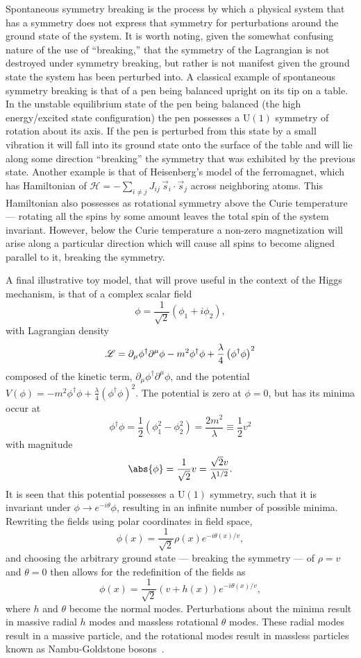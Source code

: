 Spontaneous symmetry breaking is the process by which a physical system that has a symmetry does not express that symmetry for perturbations around the ground state of the system.
It is worth noting, given the somewhat confusing nature of the use of ``breaking,'' that the symmetry of the Lagrangian is not destroyed under symmetry breaking, but rather is not manifest given the ground state the system has been perturbed into.
A classical example of spontaneous symmetry breaking is that of a pen being balanced upright on its tip on a table.
In the unstable equilibrium state of the pen being balanced (the high energy/excited state configuration) the pen possesses a $\mathrm{U}(1)$ symmetry of rotation about its axis.
If the pen is perturbed from this state by a small vibration it will fall into its ground state onto the surface of the table and will lie along some direction ``breaking'' the symmetry that was exhibited by the previous state.
Another example is that of Heisenberg’s model of the ferromagnet, which has Hamiltonian of $\mathcal{H} = -\sum_{i\neq j} J_{ij}\,\vec{s}_{i} \cdot \vec{s}_{j}$ across neighboring atoms.
This Hamiltonian also possesses as rotational symmetry above the Curie temperature --- rotating all the spins by some amount leaves the total spin of the system invariant.
However, below the Curie temperature a non-zero magnetization will arise along a particular direction which will cause all spins to become aligned parallel to it, breaking the symmetry.

A final illustrative toy model, that will prove useful in the context of the Higgs mechanism, is that of a complex scalar field
\[
 \phi = \frac{1}{\sqrt{2}} \left(\phi_{1} + i \phi_{2}\right),
\]
with Lagrangian density
\[
 \mathscr{L} = \partial_{\mu}\phi^{\dagger}\partial^{\mu}\phi - m^{2}\phi^{\dagger}\phi + \frac{\lambda}{4} \left(\phi^{\dagger}\phi\right)^{2}
\]
composed of the kinetic term, $\partial_{\mu}\phi^{\dagger}\partial^{\mu}\phi$, and the potential $V\left(\phi\right) = -m^{2}\phi^{\dagger}\phi + \frac{\lambda}{4} \left(\phi^{\dagger}\phi\right)^{2}$.
The potential is zero at $\phi=0$, but has its minima occur at
\[
 \phi^{\dagger}\phi = \frac{1}{2}\left(\phi_{1}^{2} - \phi_{2}^{2}\right) = \frac{2m^2}{\lambda} \equiv \frac{1}{2}v^{2}
\]
with magnitude
\[
 \abs{\phi} = \frac{1}{\sqrt{2}}v = \frac{\sqrt{2} v}{\lambda^{1/2}}.
\]
It is seen that this potential possesses a $\mathrm{U}(1)$ symmetry, such that it is invariant under $\phi \to e^{-i\theta}\phi$, resulting in an infinite number of possible minima.
Rewriting the fields using polar coordinates in field space,
\[
 \phi(x) = \frac{1}{\sqrt{2}} \rho\left(x\right) e^{-i \theta(x)/v},
\]
and choosing the arbitrary ground state --- breaking the symmetry --- of $\rho=v$ and $\theta=0$ then allows for the redefinition of the fields as
\[
 \phi(x) = \frac{1}{\sqrt{2}} \left(v + h\left(x\right)\right) e^{-i \theta(x)/v},
\]
where $h$ and $\theta$ become the normal modes.
Perturbations about the minima result in massive radial $h$ modes and massless rotational $\theta$ modes.
These radial modes result in a massive particle, and the rotational modes result in massless particles known as Nambu-Goldstone bosons~\cite{Nambu:1960tm,Goldstone:1961eq}.

